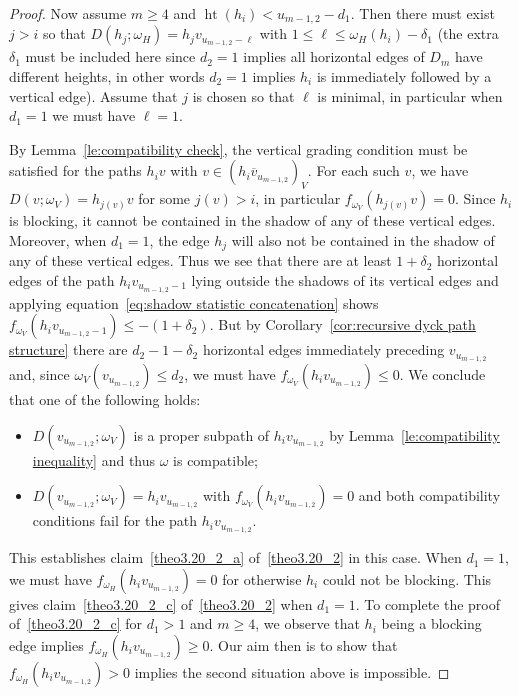 \documentclass[ALCO,ThmDefs,Unicode,epreuves]{cedram}
\DeclareMathOperator{\hgt}{ht}
\begin{document}
\begin{proof}
 Now assume $m\ge4$ and $\hgt(h_i)<u_{m-1,2}-d_1$. Then there must exist $j>i$ so that $D(h_j;\omega_H)=h_jv_{u_{m-1,2}-\ell}$ with $1\le\ell\le\omega_H(h_i)-\delta_1$
 (the extra $\delta_1$ must be included here since $d_2=1$ implies all horizontal edges of $D_m$ have different heights, in other words $d_2=1$ implies $h_i$ is immediately followed by a vertical edge). 
 Assume that $j$ is chosen so that $\ell$ is minimal, in particular when $d_1=1$ we must have $\ell=1$.

 By Lemma~\ref{le:compatibility check}, the vertical grading condition must be satisfied for the paths $h_iv$ with $v\in(h_i\overline{v}_{u_{m-1,2}})_V$.
 For each such $v$, we have $D(v;\omega_V)=h_{j(v)}v$ for some $j(v)>i$, in particular $f_{\omega_V}(h_{j(v)}v)=0$. 
 Since $h_i$ is blocking, it cannot be contained in the shadow of any of these vertical edges.
 Moreover, when $d_1=1$, the edge $h_j$ will also not be contained in the shadow of any of these vertical edges. 
 Thus we see that there are at least $1+\delta_2$ horizontal edges of the path $h_iv_{u_{m-1,2}-1}$ lying outside the shadows of its vertical edges and applying equation~\eqref{eq:shadow statistic concatenation} shows $f_{\omega_V}(h_iv_{u_{m-1,2}-1})\le-(1+\delta_2)$.
 But by Corollary~\ref{cor:recursive dyck path structure} there are $d_2-1-\delta_2$ horizontal edges immediately preceding $v_{u_{m-1,2}}$ and, since $\omega_V(v_{u_{m-1,2}})\le d_2$, we must have $f_{\omega_V}(h_iv_{u_{m-1,2}})\le0$. 
 We conclude that one of the following holds:
 \begin{itemize}
 \item $D(v_{u_{m-1,2}};\omega_V)$ is a proper subpath of $h_iv_{u_{m-1,2}}$ by Lemma~\ref{le:compatibility inequality} and thus $\omega$ is compatible;
 \item $D(v_{u_{m-1,2}};\omega_V)=h_iv_{u_{m-1,2}}$ with $f_{\omega_V}(h_iv_{u_{m-1,2}})=0$ and both compatibility conditions fail for the path $h_iv_{u_{m-1,2}}$.
 \end{itemize}
 This establishes claim~\ref{theo3.20_2_a} of~\ref{theo3.20_2} in this case. 
 When $d_1=1$, we must have $f_{\omega_H}(h_iv_{u_{m-1,2}})=0$ for otherwise $h_i$ could not be blocking.
 This gives claim~\ref{theo3.20_2_c} of~\ref{theo3.20_2} when $d_1=1$. 
 To complete the proof of~\ref{theo3.20_2_c} for $d_1>1$ and $m\ge4$, we observe that $h_i$ being a blocking edge implies $f_{\omega_H}(h_iv_{u_{m-1,2}})\ge0$.
 Our aim then is to show that $f_{\omega_H}(h_iv_{u_{m-1,2}})>0$ implies the second situation above is impossible.


\end{proof}
\end{document}
